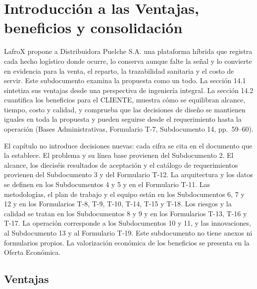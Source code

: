 
\chapter{Introducción a las Ventajas, beneficios y consolidación}
\label{cap:subdoc14}
\renewcommand{\arraystretch}{1.15}
\setlength{\tabcolsep}{4pt}
\newcommand{\tablasincorte}[1]{{\hyphenpenalty=10000\exhyphenpenalty=10000\parte{#1}}}

LafroX propone a Distribuidora Puelche S.A. una plataforma híbrida que registra cada hecho logístico donde ocurre, lo conserva aunque falte la señal y lo convierte en evidencia para la venta, el reparto, la trazabilidad sanitaria y el costo de servir. Este subdocumento examina la propuesta como un todo. La sección 14.1 sintetiza sus ventajas desde una perspectiva de ingeniería integral. La sección 14.2 cuantifica los beneficios para el CLIENTE, muestra cómo se equilibran alcance, tiempo, costo y calidad, y comprueba que las decisiones de diseño se mantienen iguales en toda la propuesta y pueden seguirse desde el requerimiento hasta la operación (Bases Administrativas, Formulario T-7, Subdocumento 14, pp.~59--60).

El capítulo no introduce decisiones nuevas: cada cifra se cita en el documento que la establece. El problema y su línea base provienen del Subdocumento 2. El alcance, los dieciséis resultados de aceptación y el catálogo de requerimientos provienen del Subdocumento 3 y del Formulario T-12. La arquitectura y los datos se definen en los Subdocumentos 4 y 5 y en el Formulario T-11. Las metodologías, el plan de trabajo y el equipo están en los Subdocumentos 6, 7 y 12 y en los Formularios T-8, T-9, T-10, T-14, T-15 y T-18. Los riesgos y la calidad se tratan en los Subdocumentos 8 y 9 y en los Formularios T-13, T-16 y T-17. La operación corresponde a los Subdocumentos 10 y 11, y las innovaciones, al Subdocumento 13 y al Formulario T-19. Este subdocumento no tiene anexos ni formularios propios. La valorización económica de los beneficios se presenta en la Oferta Económica.

\section{Ventajas}

